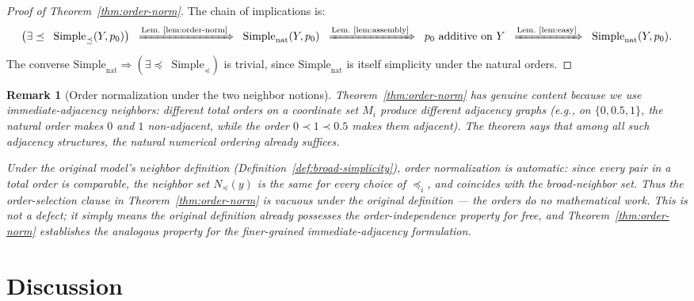 \documentclass[11pt]{article}
\newtheorem{remark}[theorem]{Remark}
\newcommand{\Simplenat}{\mathrm{Simple}_{\mathrm{nat}}}
\newcommand{\Simpleord}{\mathrm{Simple}_{\preceq}}
\begin{document}
\begin{proof}[Proof of Theorem~\ref{thm:order-norm}]
The chain of implications is:
\[
  \bigl(\exists \preceq\;\; \Simpleord(Y,p_0)\bigr)
  \;\;\xRightarrow{\text{Lem.~\ref{lem:order-norm}}}\;\;
  \Simplenat(Y,p_0)
  \;\;\xRightarrow{\text{Lem.~\ref{lem:assembly}}}\;\;
  p_0 \text{ additive on } Y
  \;\;\xRightarrow{\text{Lem.~\ref{lem:easy}}}\;\;
  \Simplenat(Y,p_0).
\]
The converse $\Simplenat \Rightarrow (\exists \preceq\;\;\Simpleord)$ is trivial,
since $\Simplenat$ is itself simplicity under the natural orders.
\end{proof}

\begin{remark}[Order normalization under the two neighbor notions]%
\label{rem:order-norm-scope}
Theorem~\ref{thm:order-norm} has genuine content because we use
\emph{immediate-adjacency} neighbors: different total orders on a
coordinate set $M_i$ produce different adjacency graphs
(e.g., on $\{0, 0.5, 1\}$, the natural order makes $0$ and $1$
non-adjacent, while the order $0 \prec 1 \prec 0.5$ makes them
adjacent).  The theorem says that among all such adjacency structures,
the natural numerical ordering already suffices.

Under the original model's neighbor definition
(Definition~\ref{def:broad-simplicity}), order normalization is
\emph{automatic}: since every pair in a total order is comparable,
the neighbor set $N_\preceq(y)$ is the same for every choice of
$\preceq_i$, and coincides with the broad-neighbor set.
Thus the order-selection clause in Theorem~\ref{thm:order-norm} is
vacuous under the original definition --- the orders do no mathematical
work.  This is not a defect; it simply means the original definition
already possesses the order-independence property for free, and
Theorem~\ref{thm:order-norm} establishes the analogous property for
the finer-grained immediate-adjacency formulation.
\end{remark}

\section{Discussion}\label{sec:discussion}
\end{document}
